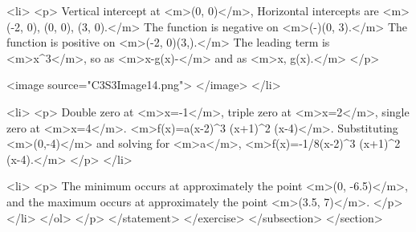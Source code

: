                         <li>
                            <p>
                                Vertical intercept at <m>(0, 0)</m>, Horizontal intercepts are <m>(-2, 0), (0, 0), (3, 0).</m> The function is negative on <m>(-)\cup(0, 3).</m> The function is positive on <m>(-2, 0)\cup(3,\infty).</m> The leading term is <m>x^{3}</m>, so as <m>x\rightarrow-\infty g(x)\to -\infty</m> and as <m>x\to \infty, g(x)\to \infty.</m>
                            </p>

                            <image source="C3S3Image14.png">
                            </image>
                        </li>

                        <li>
                            <p>
                                Double zero at <m>x=-1</m>, triple zero at <m>x=2</m>, single zero at <m>x=4</m>.
                                <m>f(x)=a(x-2)^{3} (x+1)^{2} (x-4)</m>.
                                Substituting <m>(0,-4)</m> and solving for <m>a</m>, <m>f(x)=-1/8(x-2)^{3} (x+1)^{2} (x-4).</m>
                            </p>
                        </li>

                        <li>
                            <p>
                                The minimum occurs at approximately the point <m>(0, -6.5)</m>, and the maximum occurs at approximately the point <m>(3.5, 7)</m>.
                            </p>
                        </li>
                    </ol>
                </p>
            </statement>
        </exercise>
    </subsection>
</section>